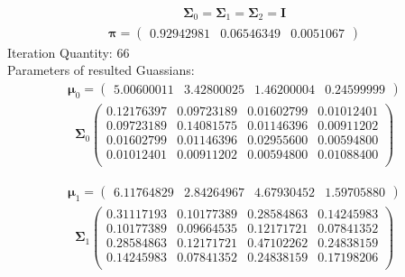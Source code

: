\documentclass[11pt,a4paper]{article}
\newcommand{\htab}{\hspace*{0.63cm}}
\newcommand{\bs}[1]{\boldsymbol{#1}}
\begin{document}
    \begin{align} 
        \bs{\Sigma}_{0} = \bs{\Sigma}_{1} = \bs{\Sigma}_{2} = \bs{I}
    \end{align} \vspace{-1cm}
    \begin{align}  \bs{\pi} = \begin{pmatrix}
        0.92942981 & 0.06546349 & 0.0051067
    \end{pmatrix} \end{align}
\htab Iteration Quantity: 66 \\
\htab Parameters of resulted Guassians:
    \begin{align} \bs{\mu}_{0} = \begin{pmatrix} 
        5.00600011 & 3.42800025 & 1.46200004 & 0.24599999 
    \end{pmatrix}  \end{align}\vspace{-1cm} 
    \begin{align} \bs{\Sigma}_{0}\begin{pmatrix} 
        0.12176397 & 0.09723189 & 0.01602799 & 0.01012401 \\ 
        0.09723189 & 0.14081575 & 0.01146396 & 0.00911202 \\ 
        0.01602799 & 0.01146396 & 0.02955600 & 0.00594800 \\ 
        0.01012401 & 0.00911202 & 0.00594800 & 0.01088400 \\ 
    \end{pmatrix} \end{align}

    \begin{align} \bs{\mu}_{1} = \begin{pmatrix} 
        6.11764829 & 2.84264967 & 4.67930452 & 1.59705880 
    \end{pmatrix}  \end{align}\vspace{-1cm} 
    \begin{align} \bs{\Sigma}_{1}\begin{pmatrix} 
        0.31117193 & 0.10177389 & 0.28584863 & 0.14245983 \\ 
        0.10177389 & 0.09664535 & 0.12171721 & 0.07841352 \\ 
        0.28584863 & 0.12171721 & 0.47102262 & 0.24838159 \\ 
        0.14245983 & 0.07841352 & 0.24838159 & 0.17198206 \\ 
    \end{pmatrix} \end{align}
\end{document}

